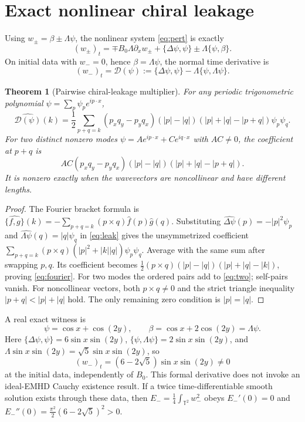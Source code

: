 \documentclass[11pt,a4paper]{article}
\newtheorem{theorem}{Theorem}
\begin{document}
\section{Exact nonlinear chiral leakage}
Using \(w_\pm=\beta\pm\Lambda\psi\), the nonlinear system \eqref{eq:pert} is exactly
\begin{equation}\label{eq:chiral}
 (w_\pm)_t=\mp B_0\Lambda\partial_xw_\pm+
 \{\Delta\psi,\psi\}\pm\Lambda\{\psi,\beta\}.
\end{equation}
On initial data with \(w_-=0\), hence \(\beta=\Lambda\psi\), the normal time derivative is
\begin{equation}\label{eq:leak}
 (w_-)_t=\mathcal D(\psi):=\{\Delta\psi,\psi\}-\Lambda\{\psi,\Lambda\psi\}.
\end{equation}
\begin{theorem}[Pairwise chiral-leakage multiplier]\label{thm:pair}
For any periodic trigonometric polynomial \(\psi=\sum_p\psi_pe^{ip\cdot x}\),
\begin{equation}\label{eq:fourier}
 \widehat{\mathcal D(\psi)}(k)=\frac12
 \sum_{p+q=k}(p_xq_y-p_yq_x)
 (|p|-|q|)(|p|+|q|-|p+q|)\psi_p\psi_q.
\end{equation}
For two distinct nonzero modes \(\psi=Ae^{ip\cdot x}+Ce^{iq\cdot x}\) with \(AC\ne0\), the coefficient at \(p+q\) is
\begin{equation}\label{eq:two}
 AC(p_xq_y-p_yq_x)(|p|-|q|)(|p|+|q|-|p+q|).
\end{equation}
It is nonzero exactly when the wavevectors are noncollinear and have different lengths.
\end{theorem}
\begin{proof}
The Fourier bracket formula is
\(\widehat{\{f,g\}}(k)=-\sum_{p+q=k}(p\times q)\widehat f(p)\widehat g(q)\).
Substituting \(\widehat{\Delta\psi}(p)=-|p|^2\psi_p\) and \(\widehat{\Lambda\psi}(q)=|q|\psi_q\) in \eqref{eq:leak} gives the unsymmetrized coefficient
\(\sum_{p+q=k}(p\times q)(|p|^2+|k||q|)\psi_p\psi_q\).
Average with the same sum after swapping \(p,q\). Its coefficient becomes
\(\tfrac12(p\times q)(|p|-|q|)(|p|+|q|-|k|)\), proving \eqref{eq:fourier}. For two modes the ordered pairs add to \eqref{eq:two}; self-pairs vanish. For noncollinear vectors, both \(p\times q\ne0\) and the strict triangle inequality \(|p+q|<|p|+|q|\) hold. The only remaining zero condition is \(|p|=|q|\).
\end{proof}
A real exact witness is
\[
 \psi=\cos x+\cos(2y),\qquad
 \beta=\cos x+2\cos(2y)=\Lambda\psi.
\]
Here \(\{\Delta\psi,\psi\}=6\sin x\sin(2y)\), \(\{\psi,\Lambda\psi\}=2\sin x\sin(2y)\), and \(\Lambda\sin x\sin(2y)=\sqrt5\sin x\sin(2y)\), so
\begin{equation}\label{eq:witness}
 (w_-)_t=(6-2\sqrt5)\sin x\sin(2y)\ne0
\end{equation}
at the initial data, independently of \(B_0\). This formal derivative does not invoke an ideal-EMHD Cauchy existence result. If a twice time-differentiable smooth solution exists through these data, then \(E_-=\frac14\int_{\mathbb T^2}w_-^2\) obeys
\(E_-'(0)=0\) and \(E_-''(0)=\frac{\pi^2}{2}(6-2\sqrt5)^2>0\).
\end{document}
